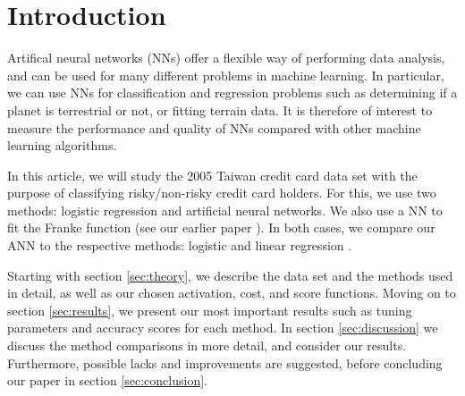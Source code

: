 \section{Introduction}
\label{sec:introduction}

Artifical neural networks (NNs) offer a flexible way of performing data analysis, and can be used
for many different problems in machine learning. In particular, we can use NNs for
classification and regression problems such as determining if a planet is terrestrial
or not, or fitting terrain data. It is therefore of interest to measure the performance
and quality of NNs compared with other machine learning algorithms.

In this article, we will study the 2005 Taiwan credit card data set with the purpose
of classifying risky/non-risky credit card holders. For this, we use two methods:
logistic regression and artificial neural networks. We also use a NN to fit
the Franke function (see our earlier paper \citet{prosjekt1}). In both cases, we compare
our ANN to the respective methods: logistic and linear regression \citep{prosjekt1}.

Starting with section \ref{sec:theory}, we describe the data set and
the methods used in detail, as well as our chosen activation, cost, and score functions.
Moving on to section \ref{sec:results}, we present our most important results such as
tuning parameters and accuracy scores for each method. In section \ref{sec:discussion}
we discuss the method comparisons in more detail, and consider our results. Furthermore,
possible lacks and improvements are suggested, before concluding our paper in section
\ref{sec:conclusion}.
